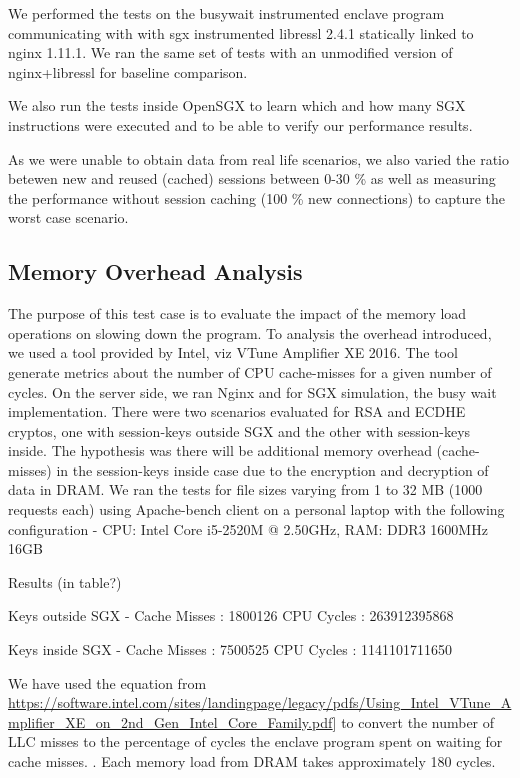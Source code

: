 \documentclass[../main.tex]{subfiles}
\begin{document}
We performed the tests on the busywait instrumented enclave program
communicating with with sgx instrumented libressl 2.4.1 statically
linked to nginx 1.11.1. We ran the same set of tests with an
unmodified version of nginx+libressl for baseline comparison.

We also run the tests inside OpenSGX to learn which and how many SGX
instructions were executed and to be able to verify our performance
results.

As we were unable to obtain data from real life scenarios, we also
varied the ratio betewen new and reused (cached) sessions between 0-30
\% as well as measuring the performance without session caching (100
\% new connections) to capture the worst case scenario.

\subsection{Memory Overhead Analysis}
The purpose of this test case is to evaluate the impact of the memory
load operations on slowing down the program. To analysis the overhead
introduced, we used a tool provided by Intel, viz VTune Amplifier XE
2016. The tool generate metrics about the number of CPU cache-misses
for a given number of cycles. On the server side, we ran Nginx and for
SGX simulation, the busy wait implementation. There were two scenarios
evaluated for RSA and ECDHE cryptos, one with session-keys outside SGX
and the other with session-keys inside. The hypothesis was there will
be additional memory overhead (cache-misses) in the session-keys
inside case due to the encryption and decryption of data in DRAM. We
ran the tests for file sizes varying from 1 to 32 MB (1000 requests
each) using Apache-bench client on a personal laptop with the
following configuration - CPU: Intel Core i5-2520M @ 2.50GHz, RAM:
DDR3 1600MHz 16GB

Results (in table?)

Keys outside SGX - 
Cache Misses : 1800126
CPU Cycles :  263912395868

Keys inside SGX - 
Cache Misses : 7500525
CPU Cycles :  1141101711650

We have used the equation from
\url{https://software.intel.com/sites/landingpage/legacy/pdfs/Using_Intel_VTune_Amplifier_XE_on_2nd_Gen_Intel_Core_Family.pdf}]
to convert the number of LLC misses to the percentage of cycles the
enclave program spent on waiting for cache misses. . Each memory load
from DRAM takes approximately 180 cycles.
\end{document}
